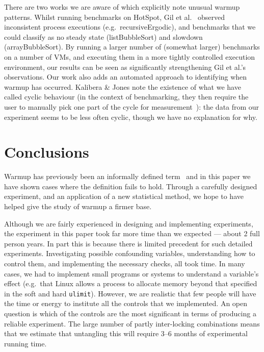 \documentclass[preprint,numbers,10pt]{sigplanconf}
\newcommand{\kalibera}{Kalibera \& Jones\xspace}
\begin{document}
There are two works we are aware of which explicitly note unusual warmup
patterns. Whilst running benchmarks on HotSpot, Gil et
al.~\cite{gil11microbenchmark} observed inconsistent process executions
(e.g.~recursiveErgodic), and benchmarks that we could classify as no
steady state (listBubbleSort) and slowdown (arrayBubbleSort). By running a
larger number of (somewhat larger) benchmarks on a number of VMs, and executing
them in a more tightly controlled execution environment, our results can be seen
as significantly strengthening Gil et al.'s observations. Our work also adds an
automated approach to identifying when warmup has occurred.
\kalibera note the
existence of what we have called cyclic behaviour (in the context of benchmarking,
they then require the user to
manually pick one part of the cycle for measurement~\cite{kalibera13rigorous}):
the data from our experiment seems to be less often cyclic, though we have no
explanation for why.


\section{Conclusions}
\label{sec:conclusion}

Warmup has previously been an informally defined term~\cite{seaton15phd} and in this
paper we have shown cases where the definition fails to hold. Through a carefully
designed experiment, and an application of a new statistical method, we hope
to have helped give the study of warmup a firmer base.

Although we are fairly experienced in designing and implementing
experiments, the experiment in this paper took far more time than we expected
--- about 2 full person years. In part this is because there is limited precedent for such detailed
experiments. Investigating possible confounding variables, understanding how to
control them, and implementing the necessary checks, all took time. In many
cases, we had to implement small programs or systems to understand a variable's
effect (e.g.~that Linux allows a process to allocate memory beyond that
specified in the soft and hard \texttt{ulimit}). However, we are realistic that
few people will have the time or energy to institute all the controls that we
implemented. An open question is which of the controls are the most significant
in terms of producing a reliable experiment. The large number of partly
inter-locking combinations means that we estimate that untangling this will
require 3--6 months of experimental running time.
\end{document}
